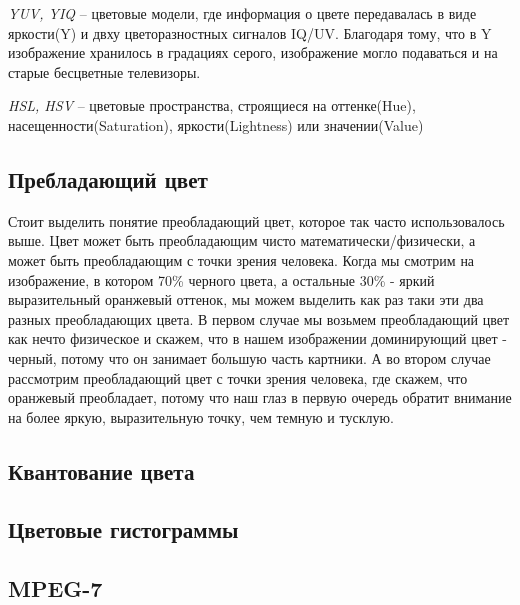 \textit{YUV, YIQ} -- цветовые модели, где информация о цвете передавалась в виде яркости(Y) и двху цветоразностных сигналов IQ/UV. Благодаря тому, что в Y изображение хранилось в градациях серого, изображение могло подаваться и на старые бесцветные телевизоры.

\textit{HSL, HSV} -- цветовые пространства, строящиеся на оттенке(Hue), насещенности(Saturation), яркости(Lightness) или значении(Value)

\begin{figure}[ht!]
\end{figure}

\subsection{ Пребладающий цвет}
Стоит выделить понятие преобладающий цвет, которое так часто использовалось выше. Цвет может быть преобладающим чисто математически/физически, а может быть преобладающим с точки зрения человека. Когда мы смотрим на изображение, в котором 70\% черного цвета, а остальные 30\% - яркий выразительный оранжевый оттенок, мы можем выделить как раз таки эти два разных преобладающих цвета. В первом случае мы возьмем преобладающий цвет как нечто физическое и скажем, что в нашем изображении доминирующий цвет - черный, потому что он занимает большую часть картники. А во втором случае рассмотрим преобладающий цвет с точки зрения человека, где скажем, что оранжевый преобладает, потому что наш глаз в первую очередь обратит внимание на более яркую, выразительную точку, чем темную и тусклую.
\subsection{ Квантование цвета}
\subsection{ Цветовые гистограммы}
\subsection{ MPEG-7}
